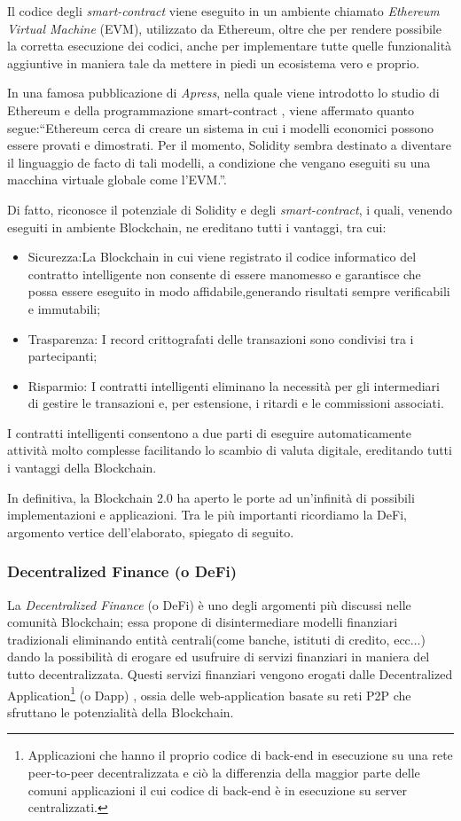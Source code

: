 Il codice degli \textit{smart-contract} viene eseguito in un ambiente chiamato \textit{Ethereum Virtual Machine} (EVM), utilizzato da Ethereum, oltre che per rendere possibile la corretta esecuzione dei codici, anche per implementare tutte quelle funzionalità aggiuntive in maniera tale da mettere in piedi un ecosistema vero e proprio.


In una famosa pubblicazione di \textit{Apress}, nella quale viene introdotto lo studio di Ethereum e della programmazione smart-contract \cite{EthereumBook}, viene affermato quanto segue:“Ethereum cerca di creare un sistema in cui i modelli economici possono essere provati e dimostrati. Per il momento, Solidity sembra destinato a diventare il linguaggio de facto di tali modelli, a condizione che vengano eseguiti su una macchina virtuale globale come l'EVM.”.

Di fatto, riconosce il potenziale di Solidity e degli \textit{smart-contract}, i quali, venendo eseguiti in ambiente Blockchain, ne ereditano tutti i vantaggi, tra cui:

\begin{itemize}
\item Sicurezza:La Blockchain in cui viene registrato il codice informatico del contratto intelligente non consente di essere manomesso e garantisce che possa essere eseguito in modo affidabile,generando risultati sempre verificabili e immutabili;
\item Trasparenza: I record crittografati delle transazioni sono condivisi tra i partecipanti;
\item Risparmio: I contratti intelligenti eliminano la necessità per gli intermediari di gestire le transazioni e, per estensione, i ritardi e le commissioni associati.
\end{itemize}

I contratti intelligenti consentono a due parti di eseguire automaticamente attività molto complesse facilitando lo scambio di valuta digitale, ereditando tutti i vantaggi della Blockchain.

In definitiva, la Blockchain 2.0 ha aperto le porte ad un'infinità di possibili implementazioni e applicazioni.
Tra le più importanti ricordiamo la DeFi, argomento vertice dell'elaborato, spiegato di seguito.

\subsubsection{Decentralized Finance (o DeFi)} 
La \textit{Decentralized Finance} (o DeFi) è uno degli argomenti più discussi nelle comunità Blockchain; essa propone di disintermediare modelli finanziari tradizionali eliminando entità centrali(come banche, istituti di credito, ecc...) dando la possibilità di erogare ed usufruire di servizi finanziari in maniera del tutto decentralizzata. Questi servizi finanziari vengono erogati dalle {Decentralized Application}\footnote{Applicazioni che hanno il proprio codice di back-end in esecuzione su una rete peer-to-peer decentralizzata e ciò la differenzia della maggior parte delle comuni applicazioni il cui codice di back-end è in esecuzione su server centralizzati.} (o Dapp) , ossia delle web-application basate su reti P2P che sfruttano le potenzialità della Blockchain.

